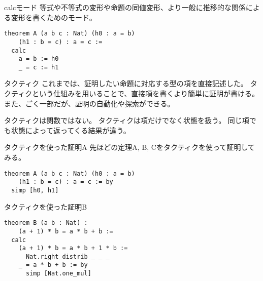 \documentclass[unicode,12pt]{beamer}%
\begin{document}
\begin{frame}[fragile]{calcモード}
  等式や不等式の変形や命題の同値変形、より一般に推移的な関係による変形を書くためのモード。
  \begin{tcolorbox}[title=Assist.lean]
    \setlength{\baselineskip}{12pt}
    \begin{Verbatim}[commandchars=\\\{\}, baselinestretch=1.5]
theorem A (a b c : Nat) (h0 : a = b)
    (h1 : b = c) : a = c :=
  calc
    a = b := h0
    _ = c := h1  
    \end{Verbatim}
    \end{tcolorbox}  
\end{frame}

\begin{frame}{タクティク}
  これまでは、証明したい命題に対応する型の項を直接記述した。
  タクティクという仕組みを用いることで、直接項を書くより簡単に証明が書ける。
  また、ごく一部だが、証明の自動化や探索ができる。

  タクティクは関数ではない。
  タクティクは項だけでなく状態を扱う。
  同じ項でも状態によって返ってくる結果が違う。
\end{frame}

\begin{frame}[fragile]{タクティクを使った証明A}
  先ほどの定理A, B, Cをタクティクを使って証明してみる。
  \begin{tcolorbox}[title=Assist.lean]
  \setlength{\baselineskip}{12pt}
  \begin{Verbatim}[commandchars=\\\{\}, baselinestretch=1.5]
theorem A (a b c : Nat) (h0 : a = b)
    (h1 : b = c) : a = c := by
  simp [h0, h1]
  \end{Verbatim}
  \end{tcolorbox}  
\end{frame}

\begin{frame}[fragile]{タクティクを使った証明B}
  \begin{tcolorbox}[title=Assist.lean]
  \setlength{\baselineskip}{12pt}
  \begin{Verbatim}[commandchars=\\\{\}, baselinestretch=1.5]
theorem B (a b : Nat) :
    (a + 1) * b = a * b + b :=
  calc
    (a + 1) * b = a * b + 1 * b :=
      Nat.right_distrib _ _ _
    _ = a * b + b := by
      simp [Nat.one_mul]
  \end{Verbatim}
  \end{tcolorbox}  
\end{frame}
\end{document}
